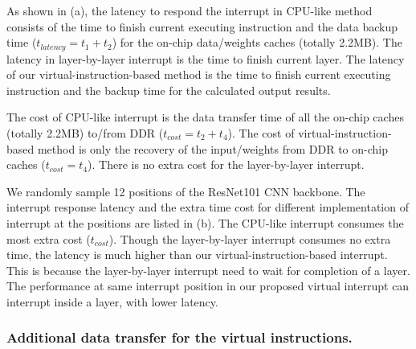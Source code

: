 As shown in (a), the latency to respond the interrupt in CPU-like method consists of the time to finish current executing instruction and the data backup time ($t_{latency} = t_1+t_2$) for the on-chip data/weights caches (totally 2.2MB). The latency in layer-by-layer interrupt is the time to finish current layer. The latency of our virtual-instruction-based method is the time to finish current executing instruction and the backup time for the calculated output results. 

The cost of CPU-like interrupt is the data transfer time of all the on-chip caches (totally 2.2MB) to/from DDR ($t_{cost} = t_2+t_4$). The cost of virtual-instruction-based method is only the recovery of the input/weights from DDR to on-chip caches ($t_{cost} = t_4$). There is no extra cost for the layer-by-layer interrupt.



We randomly sample 12 positions of the ResNet101 CNN backbone. The interrupt response latency and the extra time cost for different implementation of interrupt at the positions are listed in (b).
The CPU-like interrupt consumes the most extra cost ($t_{cost}$). Though the layer-by-layer interrupt consumes no extra time, the latency is much higher than our virtual-instruction-based interrupt. 
This is because the layer-by-layer interrupt need to wait for completion of a layer. The performance at same interrupt position in our proposed virtual interrupt can interrupt inside a layer, with lower latency.


\subsubsection{ Additional data transfer for the virtual instructions. }

